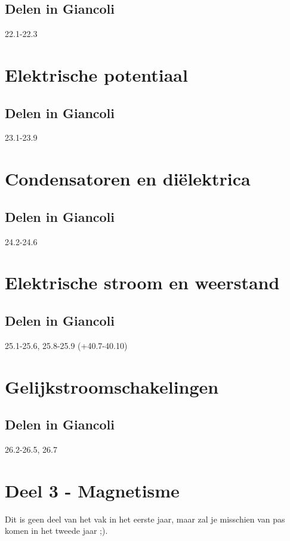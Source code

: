 \documentclass[12pt,a4paper]{article}
\begin{document}
    \subsection{Delen in Giancoli}
    22.1-22.3


	\section{Elektrische potentiaal}

    \subsection{Delen in Giancoli}
    23.1-23.9


    \section{Condensatoren en diëlektrica}

    \subsection{Delen in Giancoli}
    24.2-24.6


    \section{Elektrische stroom en weerstand}

    \subsection{Delen in Giancoli}
    25.1-25.6, 25.8-25.9 (+40.7-40.10)


    \section{Gelijkstroomschakelingen}

    \subsection{Delen in Giancoli}
    26.2-26.5, 26.7
    \newpage


    \section{Deel 3 - Magnetisme}
    Dit is geen deel van het vak in het eerste jaar, maar zal je misschien van pas komen in het tweede jaar ;).
\end{document}
